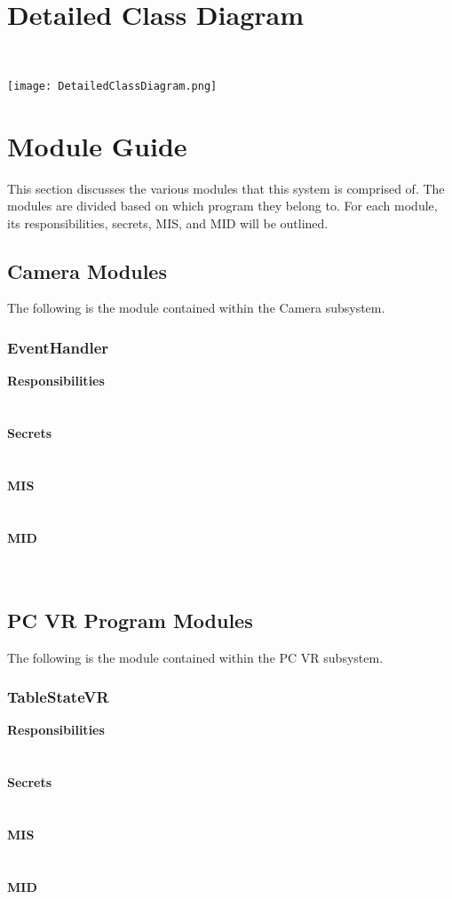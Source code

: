 \documentclass[titlepage]{article}
\begin{document}
\section{Detailed Class Diagram}~\\
\begin{center}
	\texttt{[image: DetailedClassDiagram.png]}
\label{fig:detailedClassDiagram}
\end{center}
\newpage

\section{Module Guide}
This section discusses the various modules that this system is comprised of. The modules are divided based on which program they belong to. For each module, its responsibilities, secrets, MIS, and MID will be outlined.
\subsection{Camera Modules}
The following is the module contained within the Camera subsystem.
\subsubsection{EventHandler}
\textbf{Responsibilities}\\
\\\\%
\textbf{Secrets}\\
\\\\%
\textbf{MIS}\\
\\\\%
\textbf{MID}\\
\\\\%
\subsection{PC VR Program Modules}
The following is the module contained within the PC VR subsystem.
\subsubsection{TableStateVR}
\textbf{Responsibilities}\\
\\\\%
\textbf{Secrets}\\
\\\\%
\textbf{MIS}\\
\\\\%
\textbf{MID}\\
\\\\%
\end{document}
